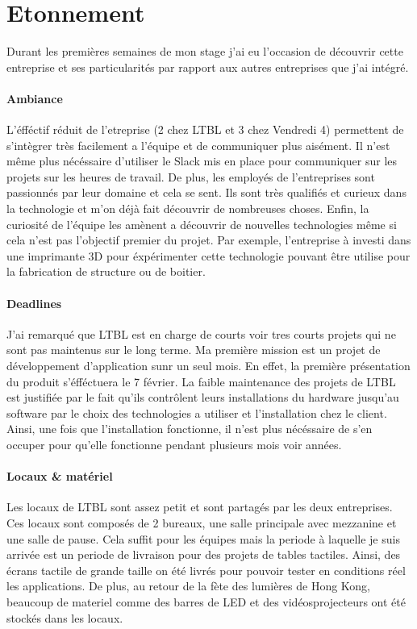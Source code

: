 \documentclass{article}
\begin{document}
\section{Etonnement}

Durant les premières semaines de mon stage j'ai eu l'occasion de découvrir cette entreprise et ses particularités par rapport aux autres entreprises que j'ai intégré.

\paragraph{Ambiance} L'éfféctif réduit de l'etreprise (2 chez LTBL et 3 chez Vendredi 4) permettent de s'intègrer très facilement a l'équipe et de communiquer plus aisément.
Il n'est même plus nécéssaire d'utiliser le Slack mis en place pour communiquer sur les projets sur les heures de travail.
De plus, les employés de l'entreprises sont passionnés par leur domaine et cela se sent.
Ils sont très qualifiés et curieux dans la technologie et m'on déjà fait découvrir de nombreuses choses.
Enfin, la curiosité de l'équipe les amènent a découvrir de nouvelles technologies même si cela n'est pas l'objectif premier du projet.
Par exemple, l'entreprise à investi dans une imprimante 3D pour éxpérimenter cette technologie pouvant être utilise pour la fabrication de structure ou de boitier.

\paragraph{Deadlines} J'ai remarqué que LTBL est en charge de courts voir tres courts projets qui ne sont pas maintenus sur le long terme.
Ma première mission est un projet de développement d'application sunr un seul mois.
En effet, la première présentation du produit s'éfféctuera le 7 février.
La faible maintenance des projets de LTBL est justifiée par le fait qu'ils contrôlent leurs installations du hardware jusqu'au software par le choix des technologies a utiliser et l'installation chez le client.
Ainsi, une fois que l'installation fonctionne, il n'est plus nécéssaire de s'en occuper pour qu'elle fonctionne pendant plusieurs mois voir années.

\paragraph{Locaux \& matériel} Les locaux de LTBL sont assez petit et sont partagés par les deux entreprises.
Ces locaux sont composés de 2 bureaux, une salle principale avec mezzanine et une salle de pause.
Cela suffit pour les équipes mais la periode à laquelle je suis arrivée est un periode de livraison pour des projets de tables tactiles.
Ainsi, des écrans tactile de grande taille on été livrés pour pouvoir tester en conditions réel les applications.
De plus, au retour de la fète des lumières de Hong Kong, beaucoup de materiel comme des barres de LED et des vidéosprojecteurs ont été stockés dans les locaux.
\end{document}
